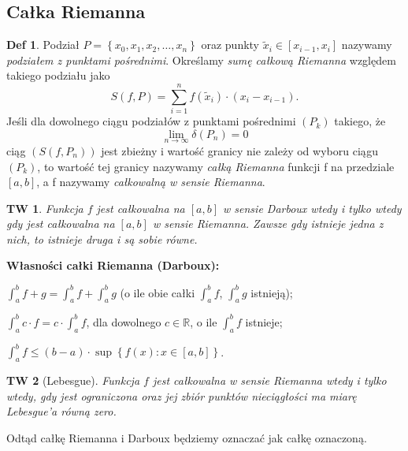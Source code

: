 \documentclass[a4paper, 12pt]{mwart}
\theoremstyle{definition}
\newtheorem{definicja}{Def}[section]
\theoremstyle{plain}
\newtheorem{twierdzenie}{TW}[section]
\theoremstyle{remark}
\newenvironment{wide_enum}{
	\vspace{3pt}
	\begin{enumerate}
		\setlength{\itemsep}{5pt}
		\setlength{\parskip}{0pt}
		\setlength{\parsep}{0pt}
}{\end{enumerate}}
\begin{document}
\subsection{Całka Riemanna}
\begin{definicja}
	Podział $P = \left\{x_0, x_1, x_2, \ldots, x_n\right\}$ oraz punkty $\tilde{x}_i \in [x_{i-1}, x_i]$ nazywamy \emph{podziałem z punktami pośrednimi}. Określamy \emph{sumę całkową Riemanna} względem takiego podziału jako
	\begin{equation}
		S(f, P) = \sum_{i = 1}^n f(\tilde{x}_i) \cdot (x_i - x_{i-1}).
	\end{equation}
	Jeśli dla dowolnego ciągu podziałów z punktami pośrednimi $(P_k)$ takiego, że
	\begin{equation}
		\lim_{n \to\infty}\delta(P_n) = 0
	\end{equation} ciąg $(S(f, P_n))$ jest zbieżny i wartość granicy nie zależy od wyboru ciągu $(P_k)$, to wartość tej granicy nazywamy \emph{całką Riemanna} funkcji f na przedziale $[a, b]$, a f nazywamy \emph{całkowalną w sensie Riemanna}.
\end{definicja}
\begin{twierdzenie}
	Funkcja $f$ jest całkowalna na $[a, b]$ w sensie Darboux wtedy i tylko wtedy gdy jest całkowalna na $[a, b]$ w sensie Riemanna. Zawsze gdy istnieje jedna z nich, to istnieje druga i są sobie równe.
\end{twierdzenie}
\vspace{20px}
{\bf Własności całki Riemanna (Darboux):}
\begin{wide_enum}
	\item $\int_a^b f + g = \int_a^b f + \int_a^b g$ (o ile obie całki $\int_a^b f$, $\int_a^b g$ istnieją);
	\item  $\int_a^b c\cdot f = c \cdot\int_a^b f$, dla dowolnego $c \in\mathbb{R}$, o ile $\int_a^b f$ istnieje;
	\item  $\int_a^b f \leq (b-a) \cdot\sup\left\{f(x) : x \in [a, b]\right\}$.
\end{wide_enum}
\vspace{20px}
\begin{twierdzenie}[Lebesgue]
	Funkcja $f$ jest całkowalna w sensie Riemanna wtedy i tylko wtedy, gdy jest ograniczona oraz jej zbiór punktów nieciągłości ma miarę Lebesgue'a równą zero.
\end{twierdzenie}
\vspace{20px}
Odtąd całkę Riemanna i Darboux będziemy oznaczać jak całkę oznaczoną.
\vspace{20px}
\end{document}
